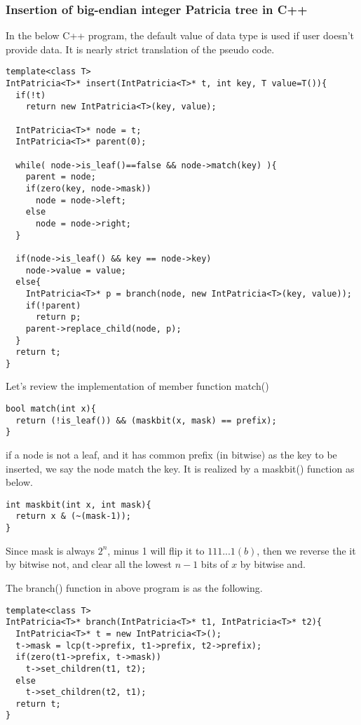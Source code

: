 \documentclass{article}
\begin{document}
\subsubsection*{Insertion of big-endian integer Patricia tree in C++}

In the below C++ program, the default value of data type is used if user
doesn't provide data. It is nearly strict translation of the pseudo code.

\lstset{language=C++}
\begin{lstlisting}
template<class T>
IntPatricia<T>* insert(IntPatricia<T>* t, int key, T value=T()){
  if(!t)
    return new IntPatricia<T>(key, value);

  IntPatricia<T>* node = t;
  IntPatricia<T>* parent(0);

  while( node->is_leaf()==false && node->match(key) ){
    parent = node;
    if(zero(key, node->mask))
      node = node->left;
    else
      node = node->right;
  }

  if(node->is_leaf() && key == node->key)
    node->value = value;
  else{
    IntPatricia<T>* p = branch(node, new IntPatricia<T>(key, value));
    if(!parent)
      return p;
    parent->replace_child(node, p);
  }
  return t;
}
\end{lstlisting}

Let's review the implementation of member function match()

\begin{lstlisting}
bool match(int x){
  return (!is_leaf()) && (maskbit(x, mask) == prefix);
}
\end{lstlisting}

if a node is not a leaf, and it has common prefix (in bitwise) as the key
to be inserted, we say the node match the key. It is realized by a maskbit()
function as below.

\begin{lstlisting}
int maskbit(int x, int mask){
  return x & (~(mask-1));
}
\end{lstlisting}

Since mask is always $2^n$, minus 1 will flip it to $111...1(b)$, then
we reverse the it by bitwise not, and clear all the lowest $n-1$ bits of
$x$ by bitwise and.

The branch() function in above program is as the following.

\begin{lstlisting}
template<class T>
IntPatricia<T>* branch(IntPatricia<T>* t1, IntPatricia<T>* t2){
  IntPatricia<T>* t = new IntPatricia<T>();
  t->mask = lcp(t->prefix, t1->prefix, t2->prefix);
  if(zero(t1->prefix, t->mask))
    t->set_children(t1, t2);
  else
    t->set_children(t2, t1);
  return t;
}
\end{lstlisting}
\end{document}

